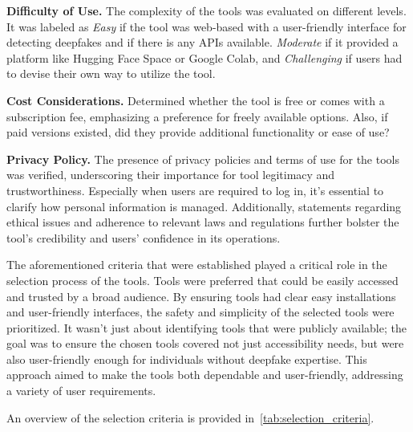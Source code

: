 \textbf{Difficulty of Use.} The complexity of the tools was evaluated on different levels.
It was labeled as \textit{Easy} if the tool was web-based with a user-friendly
interface for detecting deepfakes and if there is any \ac{API}s available. \textit{Moderate} if it provided a platform like
Hugging Face Space or Google Colab, and \textit{Challenging} if users had to devise their
own way to utilize the tool.

\textbf{Cost Considerations.} Determined whether the tool is free or comes with a
subscription fee, emphasizing a preference for freely available options. Also, if
paid versions existed, did they provide additional functionality or ease of use?

\textbf{Privacy Policy.} The presence of privacy policies and terms of use for the
tools was verified, underscoring their importance for tool legitimacy and
trustworthiness. Especially when users are required to log in, it's essential
to clarify how personal information is managed. Additionally, statements regarding
ethical issues and adherence to relevant laws and regulations further bolster the
tool's credibility and users' confidence in its operations.

The aforementioned criteria that were established played a critical role in the
selection process of the tools. Tools were preferred that could be easily
accessed and trusted by a broad audience. By ensuring tools had clear easy
installations and user-friendly interfaces, the safety and simplicity of the
selected tools were prioritized. It wasn't just about identifying tools that were
publicly available; the goal was to ensure the chosen tools covered not just
accessibility needs, but were also user-friendly enough for individuals without
deepfake expertise. This approach aimed to make the tools both dependable and
user-friendly, addressing a variety of user requirements.

An overview of the  selection criteria is provided in~\autoref{tab:selection_criteria}.

